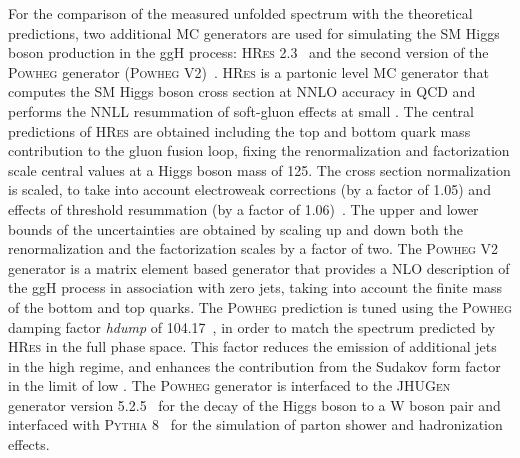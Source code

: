 For the comparison of the measured unfolded spectrum with the theoretical predictions, two additional MC generators are used for simulating the SM Higgs boson production in the ggH process: \textsc{HRes} 2.3~\cite{deFlorian:2012mx,Grazzini:2013mca} and the second version of the \textsc{Powheg} generator (\textsc{Powheg V2})~\cite{Bagnaschi:2011tu}.
\textsc{HRes} is a partonic level MC generator that computes the SM Higgs
boson cross section at NNLO accuracy in QCD and performs the NNLL
resummation of soft-gluon effects at small \pt. The central predictions of
\textsc{HRes} are obtained including the top and bottom quark mass contribution to
the gluon fusion loop, fixing the renormalization and factorization scale central values at a Higgs boson mass of 125\GeV. The cross section normalization is scaled, to take into account electroweak corrections (by a factor of 1.05) and effects of threshold resummation (by a factor of 1.06)~\cite{Actis:2008ug,Catani:2003zt}. The upper and lower bounds of the uncertainties are obtained by scaling up and down both the renormalization and the factorization scales by a factor of two.
The \textsc{Powheg V2} generator is a matrix element based generator that provides a NLO description of the ggH process in association with zero jets, taking into account the finite mass of the bottom and top quarks.
The \textsc{Powheg} prediction is tuned using the \textsc{Powheg} damping factor \textit{hdump} of 104.17~\GeV, in order to match the \pth{} spectrum predicted by \textsc{HRes} in the full phase space. This factor reduces the emission of additional jets in the high \pt regime, and enhances the contribution from the Sudakov form factor in the limit of low \pt.
The \textsc{Powheg} generator is interfaced to the \textsc{JHUGen} generator version 5.2.5~\cite{Gao:2010qx,Bolognesi:2012mm,Anderson:2013afp} for the decay of the Higgs boson to a W boson pair and interfaced with \textsc{Pythia 8}~\cite{Sjostrand:2007gs} for the simulation of parton shower and hadronization effects.

